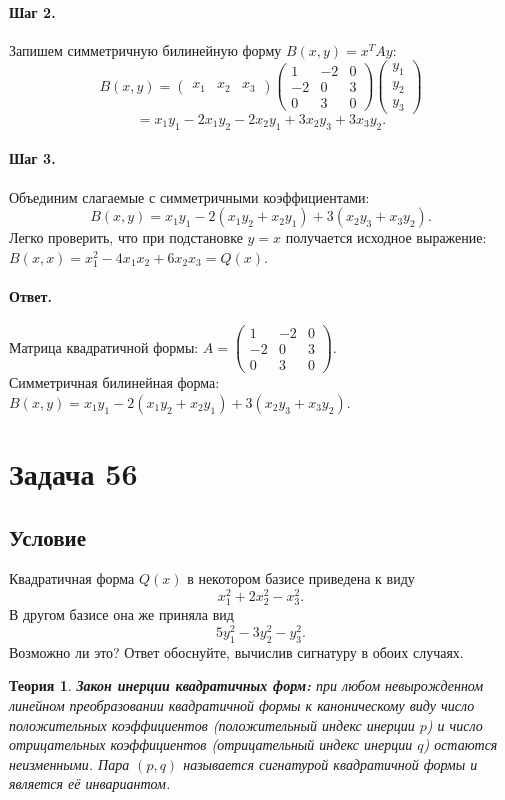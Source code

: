 \documentclass[12pt,a4paper]{article}
\theoremstyle{solution}
\newtheorem*{theory}{Теория}
\newcommand{\task}[1]{\newpage\section*{Задача #1}}
\newcommand{\answer}{\paragraph{Ответ.}}
\newcommand{\step}[1]{\paragraph{Шаг #1.}}
\begin{document}
\step{2} Запишем симметричную билинейную форму $B(x, y) = x^T A y$:
\[
B(x, y) = \begin{pmatrix} x_1 & x_2 & x_3 \end{pmatrix} \begin{pmatrix} 1 & -2 & 0 \\ -2 & 0 & 3 \\ 0 & 3 & 0 \end{pmatrix} \begin{pmatrix} y_1 \\ y_2 \\ y_3 \end{pmatrix}
\]
\[
= x_1 y_1 - 2x_1 y_2 - 2x_2 y_1 + 3x_2 y_3 + 3x_3 y_2.
\]

\step{3} Объединим слагаемые с симметричными коэффициентами:
\[
B(x, y) = x_1 y_1 - 2(x_1 y_2 + x_2 y_1) + 3(x_2 y_3 + x_3 y_2).
\]
Легко проверить, что при подстановке $y = x$ получается исходное выражение: $B(x, x) = x_1^2 - 4x_1 x_2 + 6x_2 x_3 = Q(x)$.

\answer
Матрица квадратичной формы: $A = \begin{pmatrix} 1 & -2 & 0 \\ -2 & 0 & 3 \\ 0 & 3 & 0 \end{pmatrix}$.\\
Симметричная билинейная форма: $B(x, y) = x_1 y_1 - 2(x_1 y_2 + x_2 y_1) + 3(x_2 y_3 + x_3 y_2)$.

\task{56}
\subsection*{Условие}
Квадратичная форма $Q(x)$ в некотором базисе приведена к виду
\[
x_1^2 + 2x_2^2 - x_3^2.
\]
В другом базисе она же приняла вид
\[
5y_1^2 - 3y_2^2 - y_3^2.
\]
Возможно ли это? Ответ обоснуйте, вычислив сигнатуру в обоих случаях.

\begin{theory}
\textbf{Закон инерции квадратичных форм:} при любом невырожденном линейном преобразовании квадратичной формы к каноническому виду число положительных коэффициентов (положительный индекс инерции $p$) и число отрицательных коэффициентов (отрицательный индекс инерции $q$) остаются неизменными. Пара $(p, q)$ называется сигнатурой квадратичной формы и является её инвариантом.
\end{theory}
\end{document}

